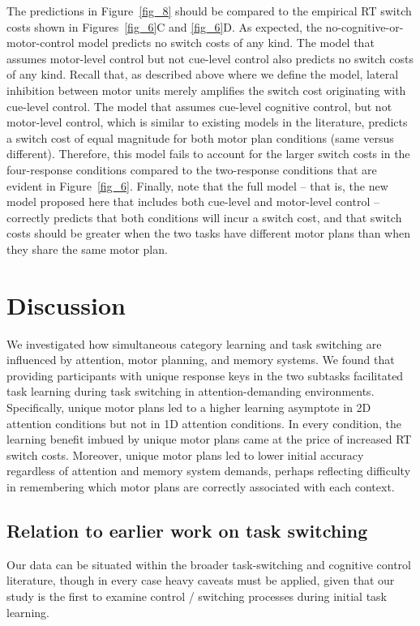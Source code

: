 \documentclass[doc, floatsintext]{apa7}
\providecommand{\DIFadd}[1]{{\protect\color{blue}\uwave{#1}}} %
\providecommand{\DIFaddbegin}{} %
\providecommand{\DIFaddend}{} %
\newcommand{\DIFaddincludegraphics}[2][]{{\color{blue}\fbox{\DIFOincludegraphics[#1]{#2}}}} %
\DeclareRobustCommand{\DIFaddbegin}{\DIFOaddbegin \let\includegraphics\DIFaddincludegraphics} %
\DeclareRobustCommand{\DIFaddend}{\DIFOaddend \let\includegraphics\DIFOincludegraphics} %
\begin{document}
The predictions in Figure~\ref{fig_8} should be compared to
the empirical RT switch costs shown in Figures~\ref{fig_6}C
and \ref{fig_6}D.  As expected, the
no-cognitive-or-motor-control model predicts no switch costs
of any kind.  The model that assumes motor-level control but
not cue-level control also predicts no switch costs of any
kind. Recall that, as described above where we define the
model, lateral inhibition between motor units merely
amplifies the switch cost originating with cue-level
control. The model that assumes cue-level cognitive control,
but not motor-level control, which is similar to existing
models in the literature, predicts a switch cost of equal
magnitude for both motor plan conditions (same versus
different).  Therefore, this model fails to account for the
larger switch costs in the four-response conditions compared
to the two-response conditions that are evident in
Figure~\ref{fig_6}.  Finally, note that the full model --
that is, the new model proposed here that includes both
cue-level and motor-level control -- correctly predicts that
both conditions will incur a switch cost, and that switch
costs should be greater when the two tasks have different
motor plans than when they share the same motor plan.

\section{Discussion}
We investigated how simultaneous category learning and task
switching are influenced by attention, motor planning, and
memory systems. We found that providing participants with
unique response keys in the two subtasks facilitated task
learning during task switching in attention-demanding
environments. Specifically, unique motor plans led to a
higher learning asymptote in 2D attention conditions but not
in 1D attention conditions. In every condition, the learning
benefit imbued by unique motor plans came at the price of
increased RT switch costs. Moreover, unique motor plans led
to lower initial accuracy regardless of attention and memory
system demands, perhaps reflecting difficulty in remembering
which motor plans are correctly associated with each
context.

\subsection{Relation to earlier work on task switching}
Our data can be situated within the broader task-switching
and cognitive control literature, though in every case heavy
caveats must be applied, given that our study is the \DIFaddbegin \DIFadd{among
}\DIFaddend first to examine control / switching processes during
initial task learning.
\end{document}
